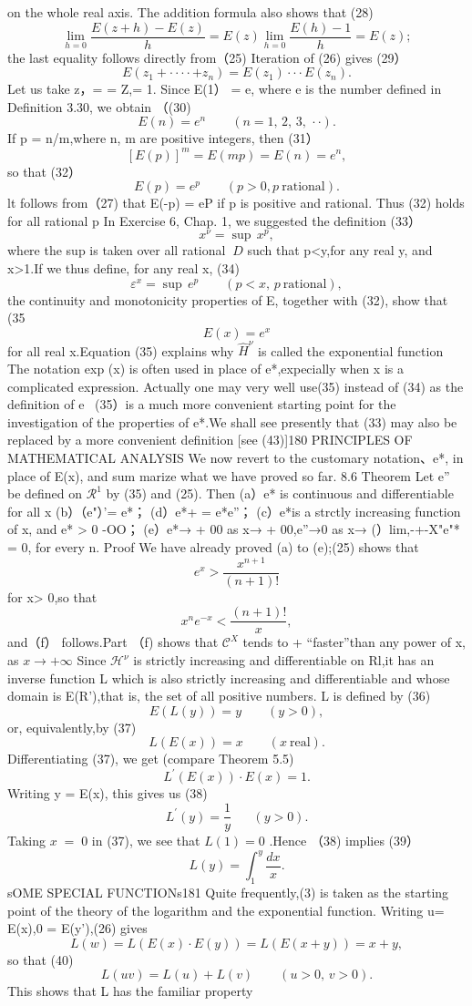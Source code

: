 on the whole real axis. The addition formula also shows that (28) $$ \operatorname*{lim}_{h=0}{\frac{E(z+h)-E(z)}{h}}=E(z)\operatorname*{lim}_{h=0}{\frac{E(h)-1}{h}}=E(z); $$ the last equality follows directly from（25) Iteration of (26) gives (29） $$ E(z_{1}+\cdot\cdot\cdot\cdot+z_{n})=E(z_{1})\cdot\cdot\cdot E(z_{n}). $$ Let us take z，= = Z,= 1. Since E(1） = e, where e is the number defined in Definition 3.30, we obtain （(30) $$ E(n)=e^{n}\qquad(n=1,\,2,\,3,\,\cdot\cdot). $$ If p = n/m,where n, m are positive integers, then (31） $$ [E(p)]^{m}=E(m p)=E(n)=e^{n}, $$ so that (32） $$ E(p)=e^{p}\qquad(p>0,p\ \mathrm{rational}). $$ lt follows from（27) that E(-p) = eP if p is positive and rational. Thus (32) holds for all rational p In Exercise 6, Chap. 1, we suggested the definition (33） $$ x^{\nu}=\operatorname{sup}\,x^{p}, $$ where the sup is taken over all rational $\ D$ such that p<y,for any real y, and x>1.If we thus define, for any real x, (34) $$ \varepsilon^{x}=\operatorname{sup}\,e^{p}\qquad(p<x,\,p{\mathrm{~rational}}), $$ the continuity and monotonicity properties of E, together with (32), show that (35 $$ E(x)=e^{x} $$ for all real x.Equation (35) explains why $\widehat{H}^{\nu}$ is called the exponential function The notation exp (x) is often used in place of e*,expecially when x is a complicated expression. Actually one may very well use(35) instead of (34) as the definition of e~ (35）is a much more convenient starting point for the investigation of the properties of e*.We shall see presently that (33) may also be replaced by a more convenient definition [see (43)]180 PRINCIPLES OF MATHEMATICAL ANALYSIS We now revert to the customary notation、e*, in place of E(x), and sum marize what we have proved so far. 8.6 Theorem Let e” be defined on $\textstyle{\mathcal{R}}^{1}$ by (35) and (25). Then (a）e* is continuous and differentiable for all x (b）（e"）'= e*； (d）e*+ = e*e”； (c）e*is a strctly increasing function of x, and e* > 0 -OO； (e）e*→ + 00 as x→ + 00,e”→0 as x→ (）lim,-+-X"e"* = 0, for every n. Proof We have already proved (a) to (e);(25) shows that $$ e^{x}>{\frac{x^{n+1}}{(n+1)!}} $$ for x> 0,so that $$ x^{n}e^{-x}<{\frac{(n+1)!}{x}}, $$ and（f） follows.Part （f) shows that ${\mathcal{C}}^{X}$ tends to + “faster”than any power of x, as $x\to+\infty$ Since ${\mathcal{H}}^{\nu}$ is strictly increasing and differentiable on Rl,it has an inverse function L which is also strictly increasing and differentiable and whose domain is E(R'),that is, the set of all positive numbers. L is defined by (36) $$ E(L(y))=y\qquad(y>0), $$ or, equivalently,by (37) $$ L(E(x))=x\qquad(x\ {\mathrm{real}}). $$ Differentiating (37), we get (compare Theorem 5.5) $$ L^{\prime}(E(x))\cdot E(x)=1. $$ Writing y = E(x), this gives us (38) $$ L^{\prime}(y)={\frac{1}{y}}\;\;\;\;\;\;(y>0). $$ Taking $\scriptstyle x\;=\;0$ in (37), we see that $L(1)=0$ .Hence （38) implies (39） $$ L(y)=\textstyle\int_{1}^{y}{\frac{d x}{x}}. $$sOME SPECIAL FUNCTIONs181 Quite frequently,(3) is taken as the starting point of the theory of the logarithm and the exponential function. Writing u= E(x),0 = E(y'),(26) gives $$ L(w)=L(E(x)\cdot E(y))=L(E(x+y))=x+y, $$ so that (40) $$ L(u v)=L(u)+L(v)\qquad(u>0,\,v>0). $$ This shows that L has the familiar property 